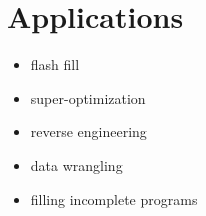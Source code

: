 \section{Applications}
\label{sec:applications}

\begin{itemize}
\item flash fill
\item super-optimization
\item reverse engineering
\item data wrangling
\item filling incomplete programs
\end{itemize}



